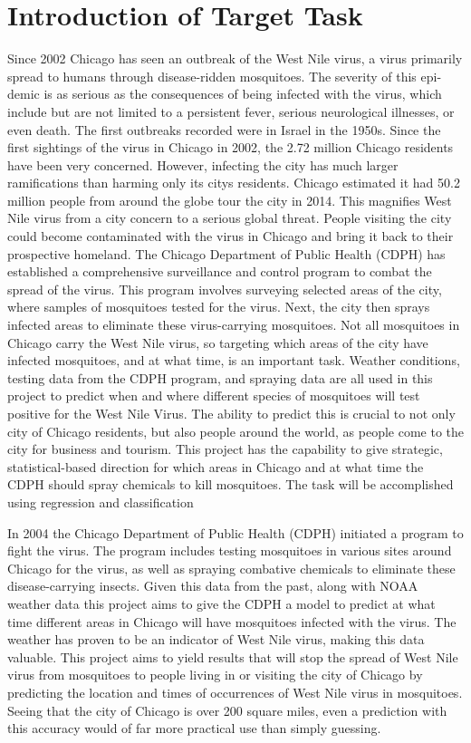 \documentclass{article} %
\begin{document}
\section{Introduction of Target Task}
Since 2002 Chicago has seen an outbreak of the West Nile virus, a virus primarily spread to humans through disease-ridden mosquitoes. The severity of this epi- demic is as serious as the consequences of being infected with the virus, which include but are not limited to a persistent fever, serious neurological illnesses, or even death. The first outbreaks recorded were in Israel in the 1950s. Since the first sightings of the virus in Chicago in 2002, the 2.72 million Chicago residents have been very concerned. However, infecting the city has much larger ramifications than harming only its citys residents. Chicago estimated it had 50.2 million people from around the globe tour the city in 2014. This magnifies West Nile virus from a city concern to a serious global threat. People visiting the city could become contaminated with the virus in Chicago and bring it back to their prospective homeland. 
The Chicago Department of Public Health (CDPH) has established a comprehensive surveillance and control program to combat the spread of the virus. This program involves surveying selected areas of the city, where samples of mosquitoes tested for the virus. Next, the city then sprays infected areas to eliminate these virus-carrying mosquitoes. Not all mosquitoes in Chicago carry the West Nile virus, so targeting which areas of the city have infected mosquitoes, and at what time, is an important task. Weather conditions, testing data from the CDPH program, and spraying data are all used in this project to predict when and where different species of mosquitoes will test positive for the West Nile Virus. The ability to predict this is crucial to not only city of Chicago residents, but also people around the world, as people come to the city for business and tourism. This project has the capability to give strategic, statistical-based direction for which areas in Chicago and at what time the CDPH should spray chemicals to kill mosquitoes. The task will be accomplished using regression and classification 

In 2004 the Chicago Department of Public Health (CDPH) initiated a program to fight the virus. The program includes testing mosquitoes in various sites around Chicago for the virus, as well as spraying combative chemicals to eliminate these disease-carrying insects. Given this data from the past, along with NOAA weather data this project aims to give the CDPH a model to predict at what time different areas in Chicago will have mosquitoes infected with the virus. The weather has proven to be an indicator of West Nile virus, making this data valuable.  This project aims to yield results that will stop the spread of West Nile virus from mosquitoes to people living in or visiting the city of Chicago by predicting the location and times of occurrences of West Nile virus in mosquitoes. Seeing that the city of Chicago is over 200 square miles, even a prediction with this accuracy would of far more practical use than simply guessing.  
\end{document}

